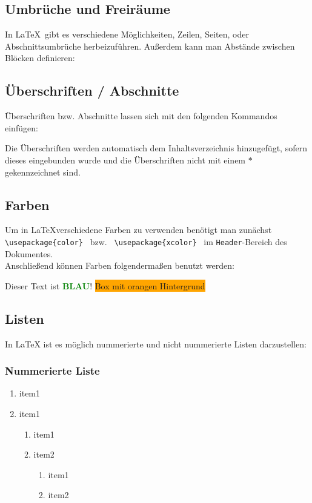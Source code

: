 \subsection{Umbrüche und Freiräume}
In \LaTeX \ gibt es verschiedene Möglichkeiten, Zeilen, Seiten, oder 
Abschnittsumbrüche herbeizuführen. Außerdem kann man Abstände zwischen Blöcken 
definieren:


\subsection{Überschriften / Abschnitte}
Überschriften bzw. Abschnitte lassen sich mit den folgenden Kommandos einfügen:

Die Überschriften werden automatisch dem Inhaltsverzeichnis hinzugefügt, sofern 
dieses eingebunden wurde und die Überschriften nicht mit einem $*$ 
gekennzeichnet sind.
\subsection{Farben}

Um in \LaTeX verschiedene Farben zu verwenden benötigt man zunächst
\lstinline$ \usepackage{color} $ bzw. \lstinline$ \usepackage{xcolor} $ im 
\texttt{Header}-Bereich des Dokumentes.
\\
Anschließend können Farben folgendermaßen benutzt werden:
\begin{flushleft}
\pagecolor{white}   %
\color{blue}         %
Dieser Text ist
\textcolor{green}{\textbf{BLAU}}!    %
\colorbox{orange}{Box mit orangen Hintergrund}   %
\color{schrift}
\\
\end{flushleft}



\subsection{Listen}
In LaTeX ist es möglich nummerierte und nicht nummerierte Listen darzustellen:
\subsubsection{Nummerierte Liste}
\begin{enumerate}
	\item item1
	\item item1
	\begin{enumerate}
		\item item1
		\item item2
		\begin{enumerate}
			\item item1
			\item item2
		\end{enumerate}
	\end{enumerate}
\end{enumerate}
